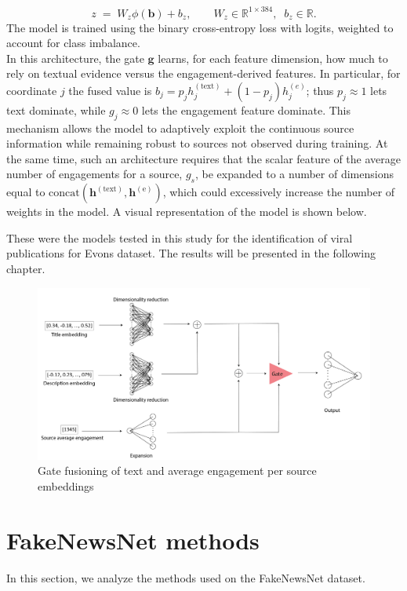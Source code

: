 \documentclass[a4paper,twoside,12pt]{book}
\begin{document}
\[
z \;=\; W_z \phi(\mathbf{b}) + b_z, \qquad
W_z \in \mathbb{R}^{1 \times 384},\;\; b_z \in \mathbb{R}.
\]
The model is trained using the binary cross-entropy loss with logits, weighted to account for class imbalance. \\

In this architecture, the gate $\mathbf{g}$ learns, for each feature dimension, how much to rely on textual evidence versus the engagement-derived features. In particular, for coordinate $j$ the fused value is $b_j = p_j h^{(\text{text})}_j + (1-p_j) h^{(e)}_j$; thus $p_j\!\approx\!1$ lets text dominate, while $g_j\!\approx\!0$ lets the engagement feature dominate. This mechanism allows the model to adaptively exploit the continuous source information while remaining robust to sources not observed during training. At the same time, such an architecture requires that the scalar feature of the average number of engagements for a source, $g_s$, be expanded to a number of dimensions equal to $\text{concat}(\mathbf{h}^{(\text{text})}, \mathbf{h}^{(\text{e})})$, which could excessively increase the number of weights in the model.
A visual representation of the model is shown below. 

These were the models tested in this study for the identification of viral publications for Evons dataset. The results will be presented in the following chapter. 

\begin{figure}[h!]
	\centering
	\includegraphics[width=1.1\textwidth]{./img/4_mlp_architecture.png}
	\caption{Gate fusioning of text and average engagement per source embeddings}
\end{figure}

\pagebreak

\section{FakeNewsNet methods}
In this section, we analyze the methods used on the FakeNewsNet dataset.
\end{document}
